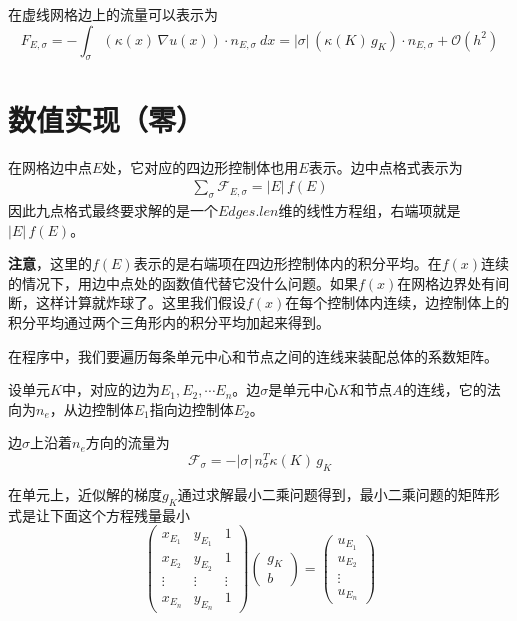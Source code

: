 \documentclass[12pt,a4paper]{article}
\theoremstyle{plain}
\begin{document}
在虚线网格边上的流量可以表示为
\begin{equation*}
F_{E, \sigma} = - \int_{\sigma} (\kappa(x) \, \nabla u(x)) \cdot n_{E, \sigma} \ dx = |\sigma| \,  (\kappa(K) \, g_K) \cdot n_{E, \sigma} + \mathcal{O}(h^2)
\end{equation*}

\section*{数值实现（零）}

在网格边中点$E$处，它对应的四边形控制体也用$E$表示。边中点格式表示为
\begin{align*}
\sum_{\sigma} \mathcal{F}_{E, \sigma} = |E| \, f(E)
\end{align*}
因此九点格式最终要求解的是一个$Edges.len$维的线性方程组，右端项就是$|E| \, f(E)$。

\textbf{注意}，这里的$f(E)$表示的是右端项在四边形控制体内的积分平均。在$f(x)$连续的情况下，用边中点处的函数值代替它没什么问题。如果$f(x)$在网格边界处有间断，这样计算就炸球了。这里我们假设$f(x)$在每个控制体内连续，边控制体上的积分平均通过两个三角形内的积分平均加起来得到。

在程序中，我们要遍历每条单元中心和节点之间的连线来装配总体的系数矩阵。

设单元$K$中，对应的边为$E_1, E_2, \cdots E_n$。边$\sigma$是单元中心$K$和节点$A$的连线，它的法向为$n_e$，从边控制体$E_1$指向边控制体$E_2$。

边$\sigma$上沿着$n_e$方向的流量为
\begin{equation*}
\mathcal{F}_{\sigma} = -|\sigma| \, n_{\sigma}^T \kappa(K) \, g_K
\end{equation*}

在单元上，近似解的梯度$g_K$通过求解最小二乘问题得到，最小二乘问题的矩阵形式是让下面这个方程残量最小
\begin{equation*}
\left(
\begin{matrix}
x_{E_1} & y_{E_1} & 1 \\
x_{E_2} & y_{E_2} & 1 \\
\vdots & \vdots & \vdots \\
x_{E_n} & y_{E_n} & 1
\end{matrix}
\right)
\left(
\begin{matrix}
g_K \\
b
\end{matrix}
\right)
=
\left(
\begin{matrix}
u_{E_1} \\
u_{E_2} \\
\vdots \\
u_{E_n}
\end{matrix}
\right)
\end{equation*}
\end{document}
